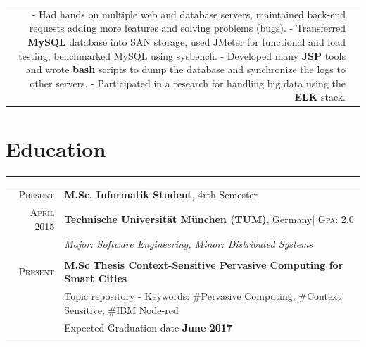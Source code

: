 \documentclass[a4paper,13pt]{article}
\begin{document}
\begin{adjustwidth}{-3cm}{}
\begin{tabular}{r|p{17.5cm}}
\footnotesize{
	- Had hands on multiple web and database servers, maintained back-end requests adding more features and solving problems (bugs).\newline 
	- Transferred \textbf{MySQL} database into SAN storage, used JMeter for functional and load testing, benchmarked MySQL using sysbench.\newline
	- Developed many \textbf{JSP} tools and wrote \textbf{bash} scripts to dump the database and synchronize the logs to other servers.\newline
	- Participated in a research for handling big data using the \textbf{ELK} stack.
}
\end{tabular}





\section{Education}
\rule[0pt]{20cm}{0.5pt}

\begin{tabular}{r|p{17.5cm}}
		

\textsc{Present} & \textbf{M.Sc. Informatik Student}, 4rth Semester\\ \textsc{April} 2015 & \normalsize\textbf{Technische Universität München (TUM)}, Germany\footnotesize \hfill| \normalsize \textsc{Gpa}: 2.0\\
& \small\emph{Major: Software Engineering, Minor: Distributed Systems}
\\ \multicolumn{2}{c}{} \\

\textsc{Present}&
\textbf{M.Sc Thesis Context-Sensitive Pervasive Computing for Smart Cities}\\
& \href{https://github.com/SalehAly/master-thesis}{Topic repository} - Keywords: \href{https://www.google.de/search?q=Pervasive+Computing}{\#Pervasive Computing}, \href{https://www.google.de/search?q=context+sensitive}{\#Context Sensitive}, \href{nodered.org}{\#IBM Node-red} \\
& Expected Graduation date \textbf{June 2017} 
\\ \multicolumn{2}{c}{} \\



\end{tabular}
\end{adjustwidth}
\end{document}
